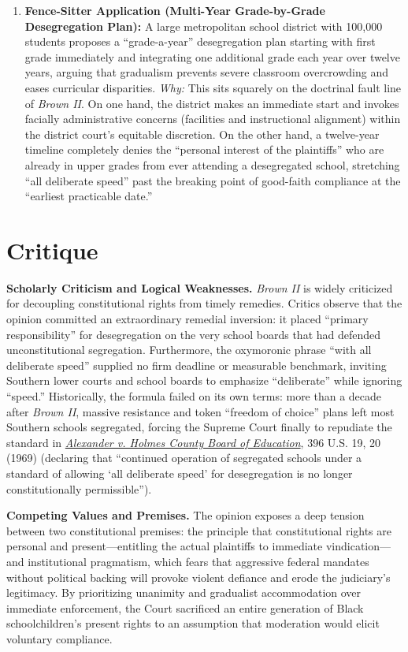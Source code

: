 \documentclass[12pt]{article}
\begin{document}
\begin{enumerate}
  \item \textbf{Fence-Sitter Application (Multi-Year Grade-by-Grade Desegregation Plan):} A large metropolitan school district with 100,000 students proposes a ``grade-a-year'' desegregation plan starting with first grade immediately and integrating one additional grade each year over twelve years, arguing that gradualism prevents severe classroom overcrowding and eases curricular disparities. \textit{Why:} This sits squarely on the doctrinal fault line of \textit{Brown II}. On one hand, the district makes an immediate start and invokes facially administrative concerns (facilities and instructional alignment) within the district court's equitable discretion. On the other hand, a twelve-year timeline completely denies the ``personal interest of the plaintiffs'' who are already in upper grades from ever attending a desegregated school, stretching ``all deliberate speed'' past the breaking point of good-faith compliance at the ``earliest practicable date.''
\end{enumerate}

\section{Critique}

\textbf{Scholarly Criticism and Logical Weaknesses.} \textit{Brown II} is widely criticized for decoupling constitutional rights from timely remedies. Critics observe that the opinion committed an extraordinary remedial inversion: it placed ``primary responsibility'' for desegregation on the very school boards that had defended unconstitutional segregation. Furthermore, the oxymoronic phrase ``with all deliberate speed'' supplied no firm deadline or measurable benchmark, inviting Southern lower courts and school boards to emphasize ``deliberate'' while ignoring ``speed.'' Historically, the formula failed on its own terms: more than a decade after \textit{Brown II}, massive resistance and token ``freedom of choice'' plans left most Southern schools segregated, forcing the Supreme Court finally to repudiate the standard in \href{https://supreme.justia.com/cases/federal/us/396/19/}{\textit{Alexander v. Holmes County Board of Education}}, 396 U.S. 19, 20 (1969) (declaring that ``continued operation of segregated schools under a standard of allowing `all deliberate speed' for desegregation is no longer constitutionally permissible'').

\textbf{Competing Values and Premises.} The opinion exposes a deep tension between two constitutional premises: the principle that constitutional rights are personal and present---entitling the actual plaintiffs to immediate vindication---and institutional pragmatism, which fears that aggressive federal mandates without political backing will provoke violent defiance and erode the judiciary's legitimacy. By prioritizing unanimity and gradualist accommodation over immediate enforcement, the Court sacrificed an entire generation of Black schoolchildren's present rights to an assumption that moderation would elicit voluntary compliance.
\end{document}
